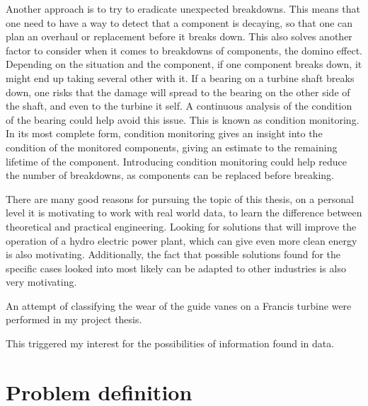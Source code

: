 Another approach is to try to eradicate unexpected breakdowns. This means that one need to have a way to detect that a component is decaying, so that one can plan an overhaul or replacement before it breaks down. This also solves another factor to consider when it comes to breakdowns  of components, the domino effect. Depending on the situation and the component, if one component breaks down, it might end up taking several other with it. If a bearing on a turbine shaft breaks down, one risks that the damage will spread to the bearing on the other side of the shaft, and even to the turbine it self. A continuous analysis of the condition of the bearing could help avoid this issue. This is known as condition monitoring. In its most complete form, condition monitoring gives an insight into the condition of the monitored components, giving an estimate to the remaining lifetime of the component. Introducing condition monitoring could help reduce the number of breakdowns, as components can be replaced before breaking. 

There are many good reasons for pursuing the topic of this thesis, on a personal level it is motivating to work with real world data, to learn the difference between theoretical and practical engineering. Looking for solutions that will improve the operation of a hydro electric power plant, which can give even more clean energy is also motivating. Additionally, the fact that possible solutions found for the specific cases looked into most likely can be adapted to other industries is also very motivating. 

An attempt of classifying the wear of the guide vanes on a Francis turbine were performed in my project thesis.  


This triggered my interest for the possibilities of information found in data. 


\section{Problem definition}


